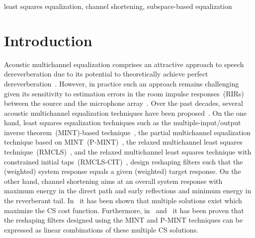 \documentclass[10pt]{IEEEtran}
\begin{document}
\begin{keywords}
least squares equalization, channel shortening, subspace-based equalization
\end{keywords}

\section{Introduction}
Acoustic multichannel equalization comprises an attractive approach to speech dereverberation due to its potential to theoretically achieve perfect dereverberation~\cite{Miyoshi_ITASS_1988,Kodrasi_ITASLP_2013}.
However, in practice such an approach remains challenging given its sensitivity to estimation errors in the room impulse responses~(RIRs) between the source and the microphone array~\cite{Kodrasi_ITASLP_2013,Zhang_IWAENC_2010}.
Over the past decades, several acoustic multichannel equalization techniques have been proposed~\cite{Miyoshi_ITASS_1988,Kodrasi_ITASLP_2013,Zhang_IWAENC_2010,Lim_IWAENC_2012,Kallinger_ICASSP_2006,Lim_ICASSP_2013,Lim_WASPAA_2013,Mertins_ITASLP_2010,Jungmann_ICASSP_2014}.
On the one hand, least squares equalization techniques such as the multiple-input/output inverse theorem~(MINT)-based technique~\cite{Miyoshi_ITASS_1988}, the partial multichannel equalization technique based on MINT~(P-MINT)~\cite{Kodrasi_ITASLP_2013}, the relaxed multichannel least squares technique~(RMCLS)~\cite{Zhang_IWAENC_2010}, and the relaxed multichannel least squares technique with constrained initial taps~(RMCLS-CIT)~\cite{Lim_IWAENC_2012}, design reshaping filters such that the (weighted) system response equals a given (weighted) target response. 
On the other hand, channel shortening aims at an overall system response with maximum energy in the direct path and early reflections and minimum energy in the reverberant tail.
In~\cite{Zhang_IWAENC_2010} it has been shown that multiple solutions exist which maximize the CS cost function.
Furthermore, in~\cite{Kodrasi_ITASLP_2013} and~\cite{Zhang_IWAENC_2010} it has been proven that the reshaping filters designed using the MINT and P-MINT techniques can be expressed as linear combinations of these multiple CS solutions.
\end{document}
